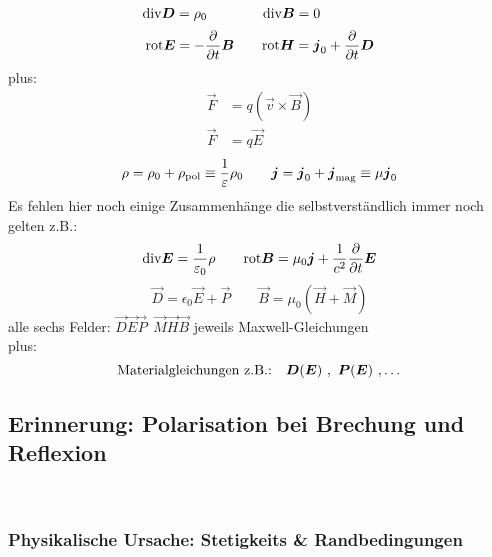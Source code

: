 \begin{equation*}
\textrm{div} \boldsymbol{D} = \rho_0 \qquad \qquad \textrm{div} \boldsymbol{B} = 0 \qquad \qquad
\end{equation*}
\begin{equation*}
\textrm{rot} \boldsymbol{E} = - \frac{\partial }{\partial t} \boldsymbol{B} \qquad \textrm{rot} \boldsymbol{H} = \boldsymbol{j}_0 + \frac{\partial }{\partial t} \boldsymbol{D}
\end{equation*}
plus:
\begin{align*}
\vec{F} &= q \left(\vec{v} \times \vec{B}\right) \\
\vec{F} &= q \vec{E}
\end{align*}
\begin{equation*}
\rho = \rho_0 + \rho_{\textrm{pol}} \equiv \frac{1}{\varepsilon} \rho_0 \qquad \boldsymbol{j} = \boldsymbol{j}_0 + \boldsymbol{j}_{\textrm{mag}} \equiv \mu \boldsymbol{j}_0
\end{equation*}
Es fehlen hier noch einige Zusammenhänge die selbstverständlich immer noch gelten z.B.:
\begin{equation*}
\textrm{div} \boldsymbol{E} = \frac{1}{\varepsilon_0} \rho \qquad \textrm{rot} \boldsymbol{B} = \mu_0 \boldsymbol{j} + \frac{1}{c^2} \frac{\partial }{\partial t} \boldsymbol{E} 
\end{equation*}
\begin{equation*}
\vec{D} = \epsilon_0 \vec{E} + \vec{P} \qquad \vec{B} = \mu_0\left(\vec{H} + \vec{M}\right)
\end{equation*}
alle sechs Felder: $\vec D  \vec E \vec P \ \ \vec M \vec H \vec B$ jeweils Maxwell-Gleichungen\\
plus:
\begin{equation*}
\textrm{Materialgleichungen z.B.:} \quad \boldsymbol{D} (\boldsymbol{E}) \ , \ \boldsymbol{P}(\boldsymbol{E}) \ , \dots
\end{equation*}

\subsection{Erinnerung: Polarisation bei Brechung und Reflexion}

\\

\subsubsection{Physikalische Ursache: Stetigkeits \& Randbedingungen}

